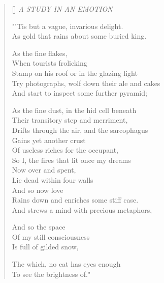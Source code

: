 \documentclass{article}
\begin{document}
\settowidth{\versewidth}{The sunset painted the sky in gold.}

\newcommand{\attrib}[1]{%
  \nopagebreak{\raggedleft\footnotesize #1\par}}

\begin{verse}[\versewidth]
\vin \textit{A STUDY IN AN EMOTION}

"'Tis but a vague, invarious delight. \\
As gold that rains about some buried king.

As the fine flakes, \\
When tourists frolicking \\
Stamp on his roof or in the glazing light \\
Try photographs, wolf down their ale and cakes \\
And start to inspect some further pyramid;

As the fine dust, in the hid cell beneath \\
Their transitory step and merriment, \\
Drifts through the air, and the sarcophagus \\
Gains yet another crust \\
Of useless riches for the occupant, \\
So I, the fires that lit once my dreams \\
Now over and spent, \\
Lie dead within four walls \\
And so now love \\
Rains down and enriches some stiff case. \\
And strews a mind with precious metaphors,

And so the space \\
Of my still consciousness \\
Is full of gilded snow,

The which, no cat has eyes enough \\
To see the brightness of."

\end{verse}

\attrib{Ezra Pound (1885-1972)}
\end{document}
